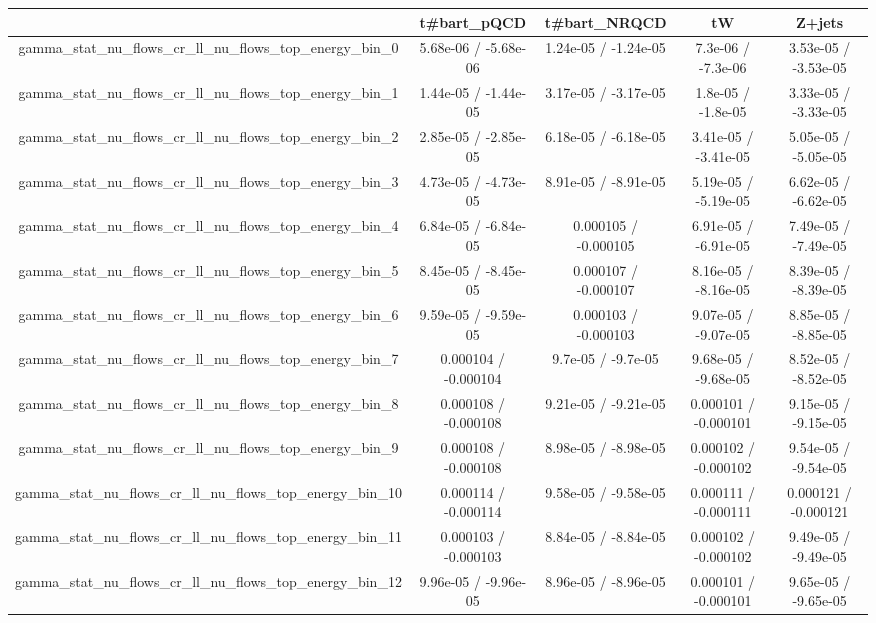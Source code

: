\documentclass[10pt]{article}
\begin{document}
\begin{table}[htbp]
\begin{center}
\begin{tabular}{|c|c|c|c|c|}
\hline 
      & t#bar{t}_{pQCD}      & t#bar{t}_{NRQCD}      & tW      & Z+jets \\ 
\hline 
  gamma_stat_nu_flows_cr_ll_nu_flows_top_energy_bin_0 & 5.68e-06 / -5.68e-06 & 1.24e-05 / -1.24e-05 & 7.3e-06 / -7.3e-06 & 3.53e-05 / -3.53e-05 \\ 
  gamma_stat_nu_flows_cr_ll_nu_flows_top_energy_bin_1 & 1.44e-05 / -1.44e-05 & 3.17e-05 / -3.17e-05 & 1.8e-05 / -1.8e-05 & 3.33e-05 / -3.33e-05 \\ 
  gamma_stat_nu_flows_cr_ll_nu_flows_top_energy_bin_2 & 2.85e-05 / -2.85e-05 & 6.18e-05 / -6.18e-05 & 3.41e-05 / -3.41e-05 & 5.05e-05 / -5.05e-05 \\ 
  gamma_stat_nu_flows_cr_ll_nu_flows_top_energy_bin_3 & 4.73e-05 / -4.73e-05 & 8.91e-05 / -8.91e-05 & 5.19e-05 / -5.19e-05 & 6.62e-05 / -6.62e-05 \\ 
  gamma_stat_nu_flows_cr_ll_nu_flows_top_energy_bin_4 & 6.84e-05 / -6.84e-05 & 0.000105 / -0.000105 & 6.91e-05 / -6.91e-05 & 7.49e-05 / -7.49e-05 \\ 
  gamma_stat_nu_flows_cr_ll_nu_flows_top_energy_bin_5 & 8.45e-05 / -8.45e-05 & 0.000107 / -0.000107 & 8.16e-05 / -8.16e-05 & 8.39e-05 / -8.39e-05 \\ 
  gamma_stat_nu_flows_cr_ll_nu_flows_top_energy_bin_6 & 9.59e-05 / -9.59e-05 & 0.000103 / -0.000103 & 9.07e-05 / -9.07e-05 & 8.85e-05 / -8.85e-05 \\ 
  gamma_stat_nu_flows_cr_ll_nu_flows_top_energy_bin_7 & 0.000104 / -0.000104 & 9.7e-05 / -9.7e-05 & 9.68e-05 / -9.68e-05 & 8.52e-05 / -8.52e-05 \\ 
  gamma_stat_nu_flows_cr_ll_nu_flows_top_energy_bin_8 & 0.000108 / -0.000108 & 9.21e-05 / -9.21e-05 & 0.000101 / -0.000101 & 9.15e-05 / -9.15e-05 \\ 
  gamma_stat_nu_flows_cr_ll_nu_flows_top_energy_bin_9 & 0.000108 / -0.000108 & 8.98e-05 / -8.98e-05 & 0.000102 / -0.000102 & 9.54e-05 / -9.54e-05 \\ 
  gamma_stat_nu_flows_cr_ll_nu_flows_top_energy_bin_10 & 0.000114 / -0.000114 & 9.58e-05 / -9.58e-05 & 0.000111 / -0.000111 & 0.000121 / -0.000121 \\ 
  gamma_stat_nu_flows_cr_ll_nu_flows_top_energy_bin_11 & 0.000103 / -0.000103 & 8.84e-05 / -8.84e-05 & 0.000102 / -0.000102 & 9.49e-05 / -9.49e-05 \\ 
  gamma_stat_nu_flows_cr_ll_nu_flows_top_energy_bin_12 & 9.96e-05 / -9.96e-05 & 8.96e-05 / -8.96e-05 & 0.000101 / -0.000101 & 9.65e-05 / -9.65e-05 \\ 

\end{tabular}
\end{center}
\end{table}
\end{document}

